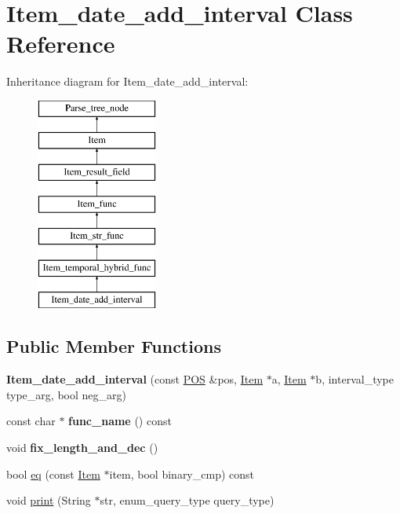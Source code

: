 \hypertarget{classItem__date__add__interval}{}\section{Item\+\_\+date\+\_\+add\+\_\+interval Class Reference}
\label{classItem__date__add__interval}
Inheritance diagram for Item\+\_\+date\+\_\+add\+\_\+interval\+:\begin{figure}[H]
\begin{center}
\leavevmode
\includegraphics[height=7.000000cm]{classItem__date__add__interval}
\end{center}
\end{figure}
\subsection*{Public Member Functions}
\begin{DoxyCompactItemize}
\item 
\mbox{\label{classItem__date__add__interval_a368d1e191df5cd319a67e50946fe761d}} 
{\bfseries Item\+\_\+date\+\_\+add\+\_\+interval} (const \mbox{\hyperlink{structYYLTYPE}{P\+OS}} \&pos, \mbox{\hyperlink{classItem}{Item}} $\ast$a, \mbox{\hyperlink{classItem}{Item}} $\ast$b, interval\+\_\+type type\+\_\+arg, bool neg\+\_\+arg)
\item 
\mbox{\label{classItem__date__add__interval_a0b26a31c5cedc507c2c57f0f1214c8c2}} 
const char $\ast$ {\bfseries func\+\_\+name} () const
\item 
\mbox{\label{classItem__date__add__interval_a58dd266da1a0e8142e70379ffc799677}} 
void {\bfseries fix\+\_\+length\+\_\+and\+\_\+dec} ()
\item 
bool \mbox{\hyperlink{classItem__date__add__interval_a1f23c39581583b37f1694f987655b772}{eq}} (const \mbox{\hyperlink{classItem}{Item}} $\ast$item, bool binary\+\_\+cmp) const
\item 
void \mbox{\hyperlink{classItem__date__add__interval_aef41086a34899cc2cfa46ab05a46dc7a}{print}} (String $\ast$str, enum\+\_\+query\+\_\+type query\+\_\+type)
\end{DoxyCompactItemize}
